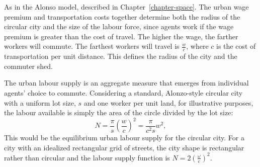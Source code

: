 

As in the Alonso model, described in Chapter~\ref{chapter-space}. The {urban wage premium} and transportation costs together determine both the radius of the circular city and the size of the labour force, %
since agents work if the wage premium is greater than the cost of travel. %
The higher the wage, the  farther workers will commute. %
The farthest workers will travel  is $\frac{w}{{c}}$, where ${c}$ is the cost of transportation per unit distance. This defines the radius of the city and the commuter shed.

The \gls{urban labour supply} is an \gls{aggregate} measure that emerges from individual agents' choice to commute. Considering a standard, Alonzo-style \gls{circular city} with a uniform lot size, $s$ and  one worker per unit land, for illustrative purposes, the labour available is simply the area of the circle divided by the lot size: 
\begin{equation}
 N = \frac{\pi}{s} \left(\frac{w}{{c}}\right)^2
   =\frac{\pi}{{c}^2 s} w^2,
\label{eqn-labour-supply1}
\end{equation}
This would be the equilibrium \gls{urban labour supply}  for the circular city. For a city with an idealized rectangular grid of streets, the city shape is rectangular rather than circular and the labour supply function is $N= 2\left(\frac{\omega}{c}\right)^2$. %


